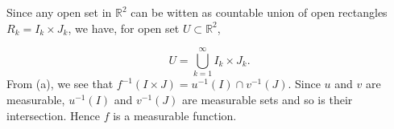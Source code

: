 \documentclass[12pt]{article}
\newcommand{\rl}{\mathbb{R}}
\begin{document}
\begin{enumerate}
\begin{mybox}
Since any open set in $\rl^2$ can be witten as countable union
of open rectangles $R_k = I_k \times J_k$, we have, for
open set $U\subset \rl^2$,

$$U=\bigcup_{k=1}^\infty{I_k\times J_k}.$$
From (a), we see that
$f^{-1}(I \times J) = u^{-1}(I) \cap v^{-1}(J)$. Since $u$
and $v$ are measurable, $u^{-1}(I)$ and $v^{-1}(J)$ are
measurable sets and so is their intersection. Hence $f$ is
a measurable function.

\end{mybox}

\end{enumerate}
\end{document}
